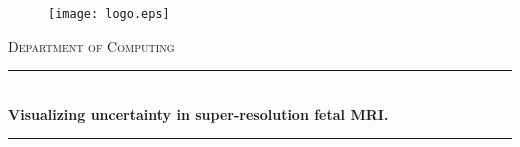 
\begin{titlepage}

\newcommand{\HRule}{\rule{\linewidth}{0.3mm}} %


\begin{figure}
  \begin{flushleft}%
	\texttt{[image: logo.eps]}\\[2cm] %
  \end{flushleft}
\end{figure}

\center %
 

\textsc{\Large Department of Computing}\\[0.5cm] %


\HRule \\[0.4cm]
{ \LARGE \bfseries Visualizing uncertainty in super-resolution fetal MRI.}\\[0cm] %
\HRule \\[1.5cm]
 


\end{titlepage}
